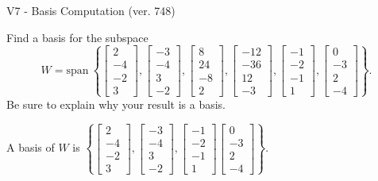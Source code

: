 \begin{exercise}
  \begin{exerciseTitle}V7 - Basis Computation (ver. 748)\end{exerciseTitle}
  \begin{exerciseStatement}
    Find a basis for the subspace 
\[W=\mathrm{span}\ \left\{\left[\begin{array}{r}
2 \\
-4 \\
-2 \\
3
\end{array}\right] , \left[\begin{array}{r}
-3 \\
-4 \\
3 \\
-2
\end{array}\right] , \left[\begin{array}{r}
8 \\
24 \\
-8 \\
2
\end{array}\right] , \left[\begin{array}{r}
-12 \\
-36 \\
12 \\
-3
\end{array}\right] , \left[\begin{array}{r}
-1 \\
-2 \\
-1 \\
1
\end{array}\right] , \left[\begin{array}{r}
0 \\
-3 \\
2 \\
-4
\end{array}\right]\right\}.\]
 Be sure to explain why your result is a basis.


  \end{exerciseStatement}
  \begin{exerciseAnswer}
   A basis of \(W\) is  \(\left\{\left[\begin{array}{r}
2 \\
-4 \\
-2 \\
3
\end{array}\right] , \left[\begin{array}{r}
-3 \\
-4 \\
3 \\
-2
\end{array}\right] , \left[\begin{array}{r}
-1 \\
-2 \\
-1 \\
1
\end{array}\right] \left[\begin{array}{r}
0 \\
-3 \\
2 \\
-4
\end{array}\right]\right\}\).
  


  \end{exerciseAnswer}
\end{exercise}